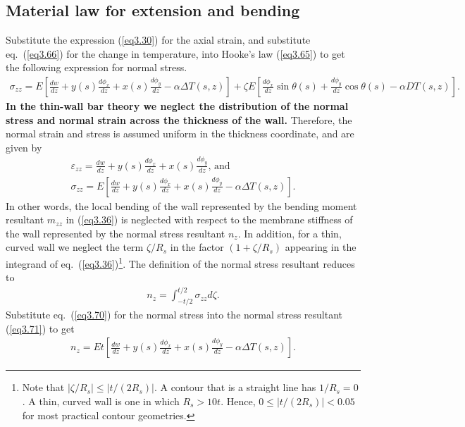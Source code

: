 \documentclass{AeroStructure-ERJohnson}
\begin{document}
\subsection{Material law for extension and bending}\label{sec3.7.2}

Substitute the expression (\ref{eq3.30}) for the axial strain, and substitute eq.~(\ref{eq3.66}) for the change in temperature, into Hooke's law (\ref{eq3.65}) to get the following expression for normal stress.
\begin{align}\label{eq3.68}
\sigma_{z z}=E\left[\frac{d w}{d z}+y(s) \frac{d \phi_{x}}{d z}+x(s) \frac{d \phi_{y}}{d z}-\alpha \Delta T(s, z)\right]+\zeta E\left[\frac{d \phi_{x}}{d z} \sin \theta(s)+\frac{d \phi_{y}}{d z} \cos \theta(s)-\alpha D T(s, z)\right].
\end{align}
\textbf{In the thin-wall bar theory we neglect the distribution of the normal stress and normal strain across the thickness of the wall.} Therefore, the normal strain and stress is assumed uniform in the thickness coordinate, and are given by
\begin{gather}
\varepsilon_{z z}=\frac{d w}{d z}+y(s) \frac{d \phi_{x}}{d z}+x(s) \frac{d \phi_{y}}{d z}\mbox{, and}\label{eq3.69}\\
\sigma_{z z}=E\left[\frac{d w}{d z}+y(s) \frac{d \phi_{x}}{d z}+x(s) \frac{d \phi_{y}}{d z}-\alpha \Delta T(s, z)\right].\label{eq3.70}
\end{gather}
In other words, the local bending of the wall represented by the bending moment resultant $m_{zz}$ in (\ref{eq3.36}) is neglected with respect to the membrane stiffness of the wall represented by the normal stress resultant $n_z$. In addition, for a thin, curved wall we neglect the term $\zeta / R_{s}$ in the factor $\left(1+\zeta / R_{s}\right)$ appearing in the integrand of eq.~(\ref{eq3.36})\footnote{Note that $|\zeta/R_s|\leq |t/(2R_s)|$. A contour that is a straight line has $1/R_s=0$. A thin, curved wall is one in which $R_s>10t$. Hence, $0\leq |t/(2R_s)|<0.05$ for most practical contour geometries\vspace*{4pt}.}. The definition of the normal stress resultant reduces to
\begin{align}\label{eq3.71}
n_{z}=\int_{-t / 2}^{t / 2} \sigma_{z z} d \zeta.
\end{align}
Substitute eq.~(\ref{eq3.70}) for the normal stress into the normal stress resultant (\ref{eq3.71}) to get
\begin{align}\label{eq3.72}
n_{z}=E t\left[\frac{d w}{d z}+y(s) \frac{d \phi_{x}}{d z}+x(s) \frac{d \phi_{y}}{d z}-\alpha \Delta T(s, z)\right].
\end{align}
\end{document}
